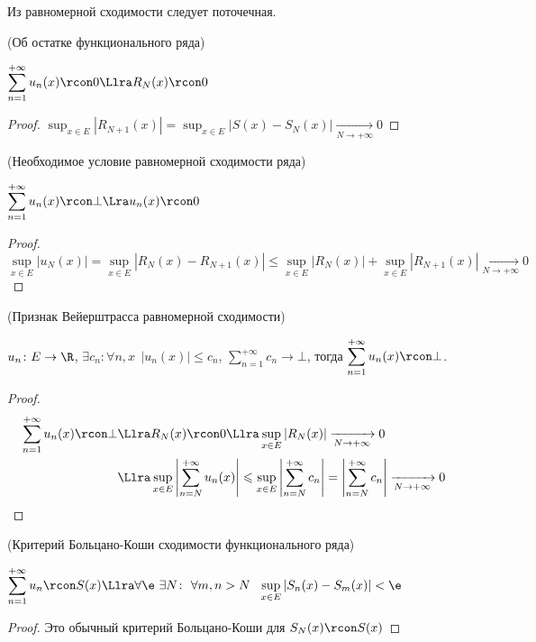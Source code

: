 \begin{remark}
    Из равномерной сходимости следует поточечная.
\end{remark}

\begin{lemma}(Об остатке функционального ряда)

    $\displaystyle \sum_{n = 1}^{+\infty}{u_n(x)} \rcon 0 \Llra R_N(x) \rcon 0$
\end{lemma}
\begin{proof}
$\displaystyle
    \sup_{x \in E}{|R_{N + 1}(x)|} = \sup_{x \in E}{|S(x) -
    S_N(x)|} \xrightarrow[N \to +\infty]{} 0
$
\end{proof}

\begin{lemma}(Необходимое условие равномерной сходимости ряда)

    $\displaystyle \sum_{n = 1}^{+\infty}{u_n(x)} \rcon \bot \Lra u_n(x) \rcon
    0$
\end{lemma}
\begin{proof}
\[
    \sup_{x \in E}{|u_N(x)|} = \sup_{x \in E}{| R_N(x) - R_{N + 1}(x)|}
    \leqslant \sup_{x \in E}{|R_N(x)|} + \sup_{x \in E}{|R_{N + 1}(x)|}
    \xrightarrow[N \to +\infty]{} 0
\]
\end{proof}

\begin{theorem}(Признак Вейерштрасса равномерной сходимости)

    $u_n \colon E \to \R$, $\exists c_n \colon \forall n, x~~ |u_n(x)|
    \leqslant c_n$, $\displaystyle \sum_{n = 1}^{+\infty}{c_n} \to \bot$,
    тогда $\displaystyle \sum_{n = 1}^{+\infty}{u_n(x)} \rcon \bot$.
\end{theorem}
\begin{proof}
\begin{align*}
    \sum_{n = 1}^{+\infty}{u_n(x)} \rcon \bot &\Llra
    R_N(x) \rcon 0 \Llra \sup_{x \in E}{|R_N(x)|} \xrightarrow[N \to +\infty]{}
    0 \\
    &\Llra \sup_{x \in E}{\left| \sum_{n = N}^{+\infty}{u_n(x)} \right|}
    \leqslant \sup_{x \in E}{\left| \sum_{n = N}^{+\infty}{c_n} \right|}
    = \left|\sum_{n = N}^{+\infty}{c_n}\right| \xrightarrow[N \to +\infty]{} 0
\end{align*}
\end{proof}

\begin{theorem}(Критерий Больцано-Коши сходимости функционального ряда)

    $\displaystyle \sum_{n = 1}^{+\infty}{u_n} \rcon S(x) \Llra
    \forall \e~ \exists N \colon~ \forall m, n > N~~ \sup_{x \in E}{|S_n(x) -
    S_m(x)|} < \e$
\end{theorem}
\begin{proof}
    Это обычный критерий Больцано-Коши для $S_N(x) \rcon S(x)$
\end{proof}


